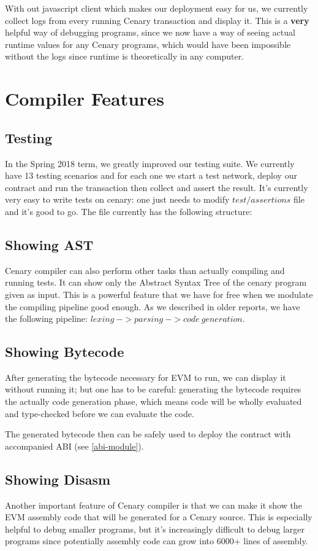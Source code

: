 \documentclass{article}
\begin{document}
\par With out javascript client which makes our deployment easy for us, we currently collect logs from every running Cenary transaction and display it. This is a \textbf{very} helpful way of debugging programs, since we now have a way of seeing actual runtime values for any Cenary programs, which would have been impossible without the logs since runtime is theoretically in any computer.

\section{Compiler Features}
\subsection{Testing}
In the Spring 2018 term, we greatly improved our testing suite. We currently have 13 testing scenarios and for each one we start a test network, deploy our contract and run the transaction then collect and assert the result. It's currently very easy to write tests on cenary: one just needs to modify $test/assertions$ file and it's good to go. The file currently has the following structure:


\newpage
\subsection{Showing AST}
Cenary compiler can also perform other tasks than actually compiling and running tests. It can show only the Abstract Syntax Tree of the cenary program given as input. This is a powerful feature that we have for free when we modulate the compiling pipeline good enough. As we described in older reports, we have the following pipeline: $lexing\ -> parsing\ -> code\ generation$.
\subsection{Showing Bytecode}
After generating the bytecode necessary for EVM to run, we can display it without running it; but one has to be careful: generating the bytecode requires the actually code generation phase, which means code will be wholly evaluated and type-checked before we can evaluate the code.
\par The generated bytecode then can be safely used to deploy the contract with accompanied ABI (see \ref{abi-module}).
\subsection{Showing Disasm}
Another important feature of Cenary compiler is that we can make it show the EVM assembly code that will be generated for a Cenary source. This is especially helpful to debug smaller programs, but it's increasingly difficult to debug larger programs since potentially assembly code can grow into 6000+ lines of assembly.
\end{document}
